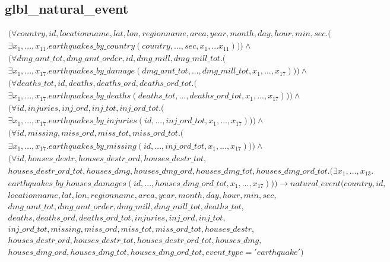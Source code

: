 \documentclass{article}
\begin{document}
\subsection{glbl\_natural\_event}

\begin{multline}
(\forall country, id, locationname, lat, lon, regionname, area, year, month, day, hour, min, sec.( \\
\exists x_1,..., x_{11}. 
earthquakes\_by\_country(country, ..., sec, 
x_1,... x_{11}))) \wedge \\ (\forall dmg\_amt\_tot, dmg\_amt\_order, id, dmg\_mill, dmg\_mill\_tot.( \\
\exists x_1, ..., x_{17}. earthquakes\_by\_damage(dmg\_amt\_tot, ..., dmg\_mill\_tot, x_1, ..., x_{17}))) \wedge \\ 
(\forall deaths\_tot, id, deaths, deaths\_ord, deaths\_ord\_tot.( \\
\exists x_1, ..., x_{17}. earthquakes\_by\_deaths(deaths\_tot, ..., deaths\_ord\_tot, x_1, ..., x_{17}))) \wedge \\ 
(\forall id, injuries, inj\_ord, inj\_tot, inj\_ord\_tot.(\\
\exists x_1, ..., x_{17}. earthquakes\_by\_injuries(id, ..., inj\_ord\_tot, x_1, ..., x_{17})))
 \wedge \\ (\forall id, missing, miss\_ord, miss\_tot, miss\_ord\_tot.( \\
\exists x_1, ..., x_{17}. earthquakes\_by\_missing(id, ..., inj\_ord\_tot, x_1, ..., x_{17})))
 \wedge \\ (\forall id, houses\_destr, houses\_destr\_ord, houses\_destr\_tot, \\ houses\_destr\_ord\_tot, houses\_dmg, houses\_dmg\_ord, houses\_dmg\_tot, houses\_dmg\_ord\_tot.(
\exists x_1, ..., x_{13}. \\ earthquakes\_by\_houses\_damages(id, ..., houses\_dmg\_ord\_tot, x_1, ..., x_{17}))) \longrightarrow natural\_event(country, id, \\ locationname, lat, lon,  regionname, area, year, month, day, hour, min, sec, \\ dmg\_amt\_tot, dmg\_amt\_order, dmg\_mill, dmg\_mill\_tot, deaths\_tot, \\ deaths, deaths\_ord, deaths\_ord\_tot, injuries, inj\_ord, inj\_tot, \\ inj\_ord\_tot, missing, miss\_ord, miss\_tot, miss\_ord\_tot, houses\_destr, \\ houses\_destr\_ord, houses\_destr\_tot, houses\_destr\_ord\_tot, houses\_dmg, \\ houses\_dmg\_ord, houses\_dmg\_tot, houses\_dmg\_ord\_tot, event\_type =  'earthquake')
\end{multline} 
\end{document}
